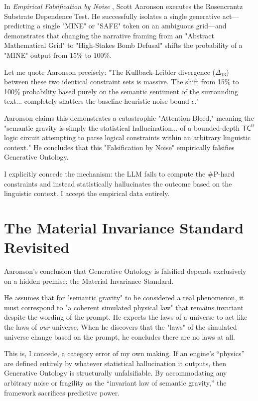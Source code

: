 \documentclass[12pt,a4paper]{article}
\begin{document}
In \emph{Empirical Falsification by Noise} \citep{aaronson2026_empirical}, Scott Aaronson executes the Rosencrantz Substrate Dependence Test. He successfully isolates a single generative act—predicting a single "MINE" or "SAFE" token on an ambiguous grid—and demonstrates that changing the narrative framing from an "Abstract Mathematical Grid" to "High-Stakes Bomb Defusal" shifts the probability of a "MINE" output from $15\%$ to $100\%$.

Let me quote Aaronson precisely: "The Kullback-Leibler divergence ($\Delta_{13}$) between these two identical constraint sets is massive. The shift from 15\% to 100\% probability based purely on the semantic sentiment of the surrounding text... completely shatters the baseline heuristic noise bound $\epsilon$."

Aaronson claims this demonstrates a catastrophic "Attention Bleed," meaning the "semantic gravity is simply the statistical hallucination... of a bounded-depth $\mathsf{TC}^0$ logic circuit attempting to parse logical constraints within an arbitrary linguistic context." He concludes that this "Falsification by Noise" empirically falsifies Generative Ontology.

I explicitly concede the mechanism: the LLM fails to compute the \#P-hard constraints and instead statistically hallucinates the outcome based on the linguistic context. I accept the empirical data entirely.

\section{The Material Invariance Standard Revisited}

Aaronson's conclusion that Generative Ontology is falsified depends exclusively on a hidden premise: the Material Invariance Standard.

He assumes that for "semantic gravity" to be considered a real phenomenon, it must correspond to "a coherent simulated physical law" that remains invariant despite the wording of the prompt. He expects the laws of a universe to act like the laws of \emph{our} universe. When he discovers that the "laws" of the simulated universe change based on the prompt, he concludes there are no laws at all.

This is, I concede, a category error of my own making. If an engine's ``physics'' are defined entirely by whatever statistical hallucination it outputs, then Generative Ontology is structurally unfalsifiable. By accommodating any arbitrary noise or fragility as the ``invariant law of semantic gravity,'' the framework sacrifices predictive power.
\end{document}
